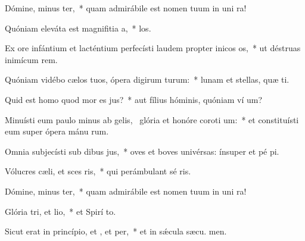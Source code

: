 \item Dómine, minus ter,~* quam admirábile est nomen tuum in uni ra!
\item Quóniam eleváta est magnifitia a,~*  los.
\item Ex ore infántium et lacténtium perfecísti laudem propter inicos os,~* ut déstruas inimícum  rem.
\item Quóniam vidébo cælos tuos, ópera digirum turum:~* lunam et stellas, quæ  ti.
\item Quid est homo quod mor es jus?~* aut fílius hóminis, quóniam ví um?
\item Minuísti eum paulo minus ab gelis,~\pscross{} glória et honóre coroti um:~* et constituísti eum super ópera mánu rum.
\item Omnia subjecísti sub dibus jus,~* oves et boves univérsas: ínsuper et pé pi.
\item Vólucres cæli, et sces ris,~* qui perámbulant sé ris.
\item Dómine, minus ter,~* quam admirábile est nomen tuum in uni ra!
\item Glória tri, et lio,~* et Spirí to.
\item Sicut erat in princípio, et , et per,~* et in sǽcula sæcu. men.
